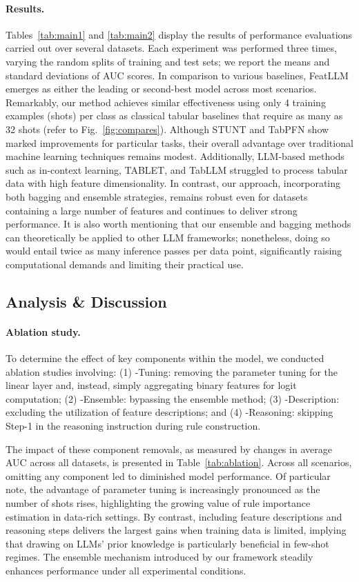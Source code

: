 \vspace*{-0.12in}
\paragraph{Results.}
Tables~\ref{tab:main1} and \ref{tab:main2} display the results of performance evaluations carried out over several datasets. Each experiment was performed three times, varying the random splits of training and test sets; we report the means and standard deviations of AUC scores. In comparison to various baselines, \textsf{FeatLLM} emerges as either the leading or second-best model across most scenarios. Remarkably, our method achieves similar effectiveness using only 4 training examples (shots) per class as classical tabular baselines that require as many as 32 shots (refer to Fig.~\ref{fig:compares}). Although STUNT and TabPFN show marked improvements for particular tasks, their overall advantage over traditional machine learning techniques remains modest. Additionally, LLM-based methods such as in-context learning, TABLET, and TabLLM struggled to process tabular data with high feature dimensionality. In contrast, our approach, incorporating both bagging and ensemble strategies, remains robust even for datasets containing a large number of features and continues to deliver strong performance. It is also worth mentioning that our ensemble and bagging methods can theoretically be applied to other LLM frameworks; nonetheless, doing so would entail twice as many inference passes per data point, significantly raising computational demands and limiting their practical use.

\subsection{Analysis \& Discussion}
\label{sec:analysis}
\paragraph{Ablation study.} To determine the effect of key components within the model, we conducted ablation studies involving: (1) \textsf{-Tuning}: removing the parameter tuning for the linear layer and, instead, simply aggregating binary features for logit computation; (2) \textsf{-Ensemble}: bypassing the ensemble method; (3) \textsf{-Description}: excluding the utilization of feature descriptions; and (4) \textsf{-Reasoning}: skipping Step-1 in the reasoning instruction during rule construction.

The impact of these component removals, as measured by changes in average AUC across all datasets, is presented in Table~\ref{tab:ablation}. Across all scenarios, omitting any component led to diminished model performance. Of particular note, the advantage of parameter tuning is increasingly pronounced as the number of shots rises, highlighting the growing value of rule importance estimation in data-rich settings. By contrast, including feature descriptions and reasoning steps delivers the largest gains when training data is limited, implying that drawing on LLMs' prior knowledge is particularly beneficial in few-shot regimes. The ensemble mechanism introduced by our framework steadily enhances performance under all experimental conditions.

